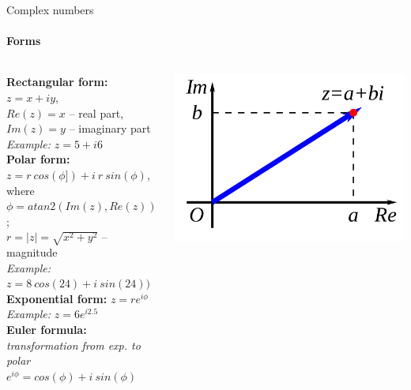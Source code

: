 \documentclass[aspectratio=169]{beamer}
\begin{document}
\begin{frame}[t]{Complex numbers}
    \framesubtitle{Forms}
    \vspace{-0.5cm}
    \begin{columns}[T,onlytextwidth]
        \begin{column}{0.55\textwidth}
            \textbf{Rectangular form:} $z=x+iy$, \\
            $Re(z)=x$ -- real part, $Im(z)=y$ -- imaginary part \\
            \textit{Example:} $z=5 + i6$ \\
            \textbf{Polar form:} $z=r\ cos(\phi]) + i\ r\ sin(\phi) $, where \\
            $\phi = atan2(Im(z),Re(z))$; \\
            $r = |z|=\sqrt{x^2+y^2}$ -- magnitude \\
            \textit{Example:} $z=8\ cos(24)+i\ sin(24))$ \\
            \textbf{Exponential form:} $z=re^{i \phi}$ \\
            \textit{Example:} $z=6e^{i 2.5}$ \\
            \textbf{Euler formula:} \textit{transformation from exp. to polar} \\
            $e^{i\phi} = cos(\phi) + i\ sin(\phi)$
        \end{column}
        \begin{column}{0.44\textwidth}
            \vspace{-0.8cm}
            \begin{minipage}{0.58\textwidth}
                \centering\includegraphics[width=\textwidth,keepaspectratio]{rectangular_form.png}

\end{minipage}
\end{column}
\end{columns}
\end{frame}
\end{document}
